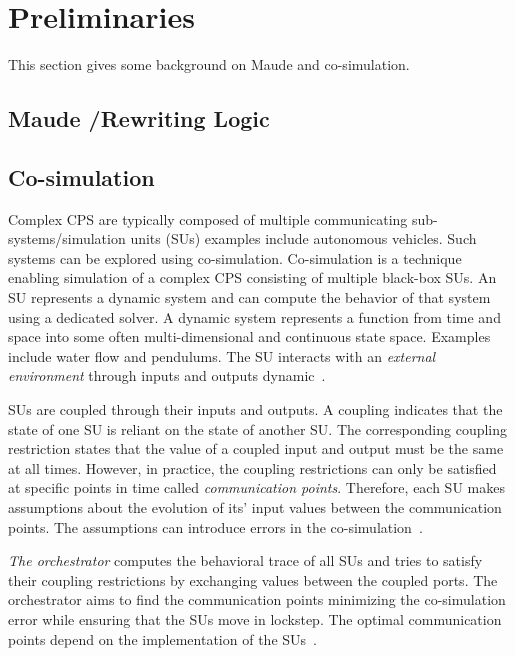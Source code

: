 \section{Preliminaries}\label{sc:background}
This section gives some background on Maude and co-simulation.

\subsection{Maude /Rewriting Logic}

\subsection{Co-simulation}
Complex CPS are typically composed of multiple communicating sub-systems/simulation units (SUs) examples include autonomous vehicles. 
Such systems can be explored using co-simulation.
Co-simulation is a technique enabling simulation of a complex CPS consisting of multiple black-box SUs. 
An SU represents a dynamic system and can compute the behavior of that system using a dedicated solver. 
A dynamic system represents a function from time and space into some often multi-dimensional and continuous state space. 
Examples include water flow and pendulums. 
The SU interacts with an \emph{external environment} through inputs and outputs dynamic~\cite{Gomes2019a,Kubler2000}.

SUs are coupled through their inputs and outputs.
A coupling indicates that the state of one SU is reliant on the state of another SU.
The corresponding coupling restriction states that the value of a coupled input and output must be the same at all times.
However, in practice, the coupling restrictions can only be satisfied at specific points in time called \emph{communication points}. 
Therefore, each SU makes assumptions about the evolution of its' input values between the communication points.
The assumptions can introduce errors in the co-simulation~\cite{Arnold2014}.

\emph{The orchestrator} computes the behavioral trace of all SUs and tries to satisfy their coupling restrictions by exchanging values between the coupled ports. 
The orchestrator aims to find the communication points minimizing the co-simulation error while ensuring that the SUs move in lockstep. 
The optimal communication points depend on the implementation of the SUs~\cite{Gomes2019,Oakes2021,Gomes2018f,Schweizer2015c,Gomes2018a}.

